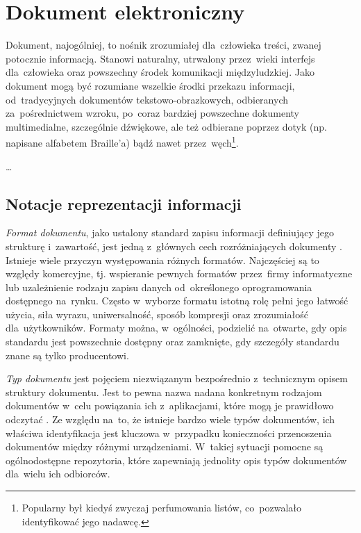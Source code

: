 \chapter{Dokument elektroniczny}
\label{chap:DokumentElektroniczny}
Dokument, najogólniej, to nośnik zrozumiałej dla~człowieka treści, zwanej potocznie informacją. Stanowi naturalny, utrwalony przez~wieki interfejs dla~człowieka oraz powszechny środek komunikacji międzyludzkiej. Jako dokument mogą być rozumiane wszelkie środki przekazu informacji, od~tradycyjnych dokumentów tekstowo-obrazkowych, odbieranych za~pośrednictwem wzroku, po~coraz bardziej powszechne dokumenty multimedialne, szczególnie dźwiękowe, ale też odbierane poprzez dotyk (np. napisane alfabetem Braille'a) bądź nawet przez~węch\footnote{Popularny był kiedyś zwyczaj perfumowania listów, co~pozwalało identyfikować jego nadawcę.}. 

\dots

\section{Notacje reprezentacji informacji}
\label{sec:NotacjeReprezentacjiInformacji}

\emph{Format dokumentu}, jako ustalony standard zapisu informacji definiujący jego strukturę i~zawartość, jest jedną z~głównych cech rozróżniających dokumenty \cite{techterms}. Istnieje wiele przyczyn występowania różnych formatów. Najczęściej są to względy komercyjne, tj. wspieranie pewnych formatów przez~firmy informatyczne lub uzależnienie rodzaju zapisu danych od~określonego oprogramowania dostępnego na~rynku. Często w~wyborze formatu istotną rolę pełni jego łatwość użycia, siła wyrazu, uniwersalność, sposób kompresji oraz zrozumiałość dla~użytkowników. Formaty można, w~ogólności, podzielić na~otwarte, gdy opis standardu jest powszechnie dostępny oraz zamknięte, gdy szczegóły standardu znane są tylko producentowi. 

\emph{Typ dokumentu} jest pojęciem niezwiązanym bezpośrednio z~technicznym opisem struktury dokumentu. Jest to pewna nazwa nadana konkretnym rodzajom dokumentów w~celu powiązania ich z~aplikacjami, które mogą je prawidłowo odczytać \cite{techterms}. Ze względu na~to, że istnieje bardzo wiele typów dokumentów, ich właściwa identyfikacja jest kluczowa w~przypadku konieczności przenoszenia dokumentów między różnymi urządzeniami. W~takiej sytuacji pomocne są ogólnodostępne repozytoria, które zapewniają jednolity opis typów dokumentów dla~wielu ich odbiorców.

